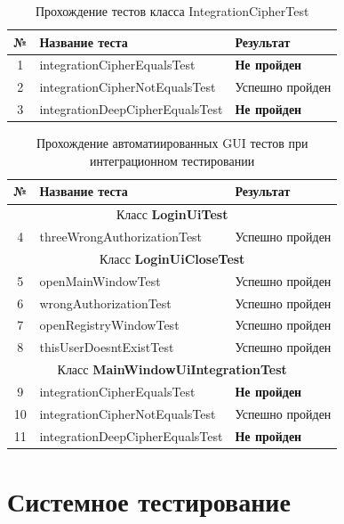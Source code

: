 \documentclass[a4paper,12pt]{article}
\begin{document}
\begin{table}[h]
	\caption{Прохождение тестов класса IntegrationCipherTest}
	\centering
	\begin{tabular}{|c|l|l|}
	\hline 
	№ &  Название теста & Результат \\ 
	\hline 
	1 &  integrationCipherEqualsTest & \textbf{Не пройден}  \\
	\hline 
	2 &  integrationCipherNotEqualsTest & Успешно пройден  \\
	\hline 
	3 & integrationDeepCipherEqualsTest & \textbf{Не пройден}  \\
	\hline 
\end{tabular} 
\label{table:modul_testing_IntegrationCipherTest} 
\end{table}

\begin{table}[h!]
	\caption{Прохождение автоматиированных GUI тестов при интеграционном тестировании}
	\centering
	\begin{tabular}{|c|l|l|}
	\hline 
	№ &  Название теста & Результат \\ 
	\hline 
	\multicolumn{3}{|c|}{Класс \textbf{LoginUiTest}}\\
	\hline
	4 & threeWrongAuthorizationTest & Успешно пройден  \\
	\hline 
	\multicolumn{3}{|c|}{Класс \textbf{LoginUiCloseTest}}\\
	\hline
	5 & openMainWindowTest & Успешно пройден  \\
	\hline
	6 & wrongAuthorizationTest & Успешно пройден  \\
	\hline
	7 & openRegistryWindowTest & Успешно пройден  \\
	\hline
	8 & thisUserDoesntExistTest & Успешно пройден  \\
	\hline 
	\multicolumn{3}{|c|}{Класс \textbf{MainWindowUiIntegrationTest}}\\
	\hline 
	9 & integrationCipherEqualsTest & \textbf{Не пройден}  \\
	\hline
	10 & integrationCipherNotEqualsTest & Успешно пройден  \\
	\hline
	11 & integrationDeepCipherEqualsTest &  \textbf{Не пройден}  \\
	\hline
\end{tabular} 
\label{table:modul_testing_gui} 
\end{table}

\newpage \section{Системное тестирование}
\end{document}
